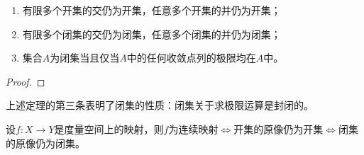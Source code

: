 \begin{definition}[开集和闭集]
    
\end{definition}
\begin{theorem}[开集闭集的基本性质]
    \begin{enumerate}
        \item 有限多个开集的交仍为开集，任意多个开集的并仍为开集；
        \item 有限多个闭集的交仍为闭集，任意多个闭集的并仍为闭集；
        \item 集合\(A\)为闭集当且仅当\(A\)中的任何收敛点列的极限均在\(A\)中。
    \end{enumerate}
\end{theorem}
\begin{proof}

\end{proof}
上述定理的第三条表明了闭集的性质：闭集关于求极限运算是封闭的。
\begin{definition}[连续映射]
    
\end{definition}
\begin{definition}[连续映射的基本性质]
    
\end{definition}
\begin{theorem}[连续映射的刻画]
    设\(f:X\to Y\)是度量空间上的映射，则\(f\)为连续映射\(\iff\)开集的原像仍为开集\(\iff\)闭集的原像仍为闭集。
\end{theorem}